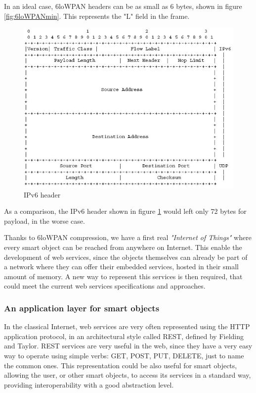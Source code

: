 In an ideal case, 6loWPAN headers can be as small as 6 bytes, shown in figure \ref{fig:6loWPANmin}.
This represents the "L" field in the frame.
\begin{figure}[htb]
	\centering
	\includegraphics[width=1\columnwidth]{chapters/background.images/ipv6Details.jpg}
	\caption{IPv6 header}
	\label{fig:IPv6Header}
\end{figure}
As a comparison, the IPv6 header shown in figure \ref{fig:IPv6Header} would left only 72 bytes for payload, in the worse case.

Thanks to 6loWPAN compression, we have a first real \textit{"Internet of Things"} where every smart object can be reached from anywhere on Internet.
This enable the development of web services, since the objects themselves can already be part of a network where they can offer their embedded services, hosted in their small amount of memory.
A new way to represent this services is then required, that could meet the current web services specifications and approaches.

\subsubsection{An application layer for smart objects}
In the classical Internet, web services are very often represented using the HTTP application protocol\cite{rfc2616}, in an architectural style called REST, defined by Fielding and Taylor\cite{Fielding02REST}.
REST services are very useful in the web, since they have a very easy way to operate using simple verbs: GET, POST, PUT, DELETE, just to name the common ones.
This representation could be also useful for smart objects, allowing the user, or other smart objects, to access its services in a standard way, providing interoperability with a good abstraction level.

